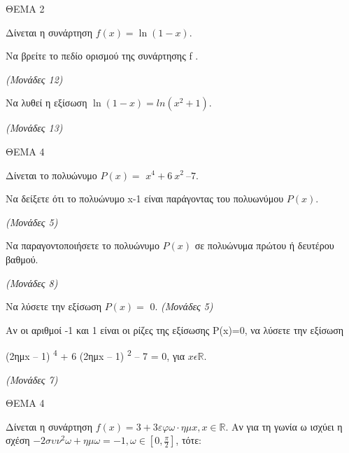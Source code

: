 \documentclass[11pt,a4paper,twoside]{book}
\newcommand{\monades}[1]{\hfill \textit{(Μονάδες #1)}}
\begin{document}
\vspace{4mm}

ΘΕΜΑ 2

Δίνεται η συνάρτηση $f(x) = \ln{(1 - x)}.$

\begin{alist}
\item Να βρείτε το πεδίο ορισμού της συνάρτησης f .

\monades{12}

\item Να λυθεί η εξίσωση $\ln(1 - x) = ln(x^{2} + 1).$

\monades{13}
\end{alist}

\vspace{4mm}

ΘΕΜΑ 4

Δίνεται το πολυώνυμο $P(x) =$ $x^{4} + 6{\ x}^{2}\ –7$.

\begin{alist}
\item Να δείξετε ότι το πολυώνυμο x-1 είναι παράγοντας του πολυωνύμου $P(x).$

\monades{5}

\item Να παραγοντοποιήσετε το πολυώνυμο $P(x)$ σε πολυώνυμα πρώτου ή δευτέρου βαθμού.

\monades{8}

\item

\begin{rlist}
\item Να λύσετε την εξίσωση $P(x) =$ 0. \monades{5}

\item Αν οι αριθμοί -1 και 1 είναι οι ρίζες της εξίσωσης P(x)=0, να λύσετε την εξίσωση

(2ημx -- 1) \textsuperscript{4} + 6 (2ημx -- 1) \textsuperscript{2} -- 7 = 0, για $x\epsilon\mathbb{R.}$

\monades{7}
\end{rlist}
\end{alist}

\vspace{4mm}

ΘΕΜΑ 4

Δίνεται η συνάρτηση $f(x) = 3 + 3\varepsilon\varphi\omega\cdot \eta\mu x, x \in \mathbb{R}$. Αν για τη γωνία ω ισχύει η σχέση $-2\sigma\upsilon\nu^2\omega + \eta\mu\omega = -1, \omega \in \left[0, \frac{\pi}{2}\right]$, τότε:
\end{document}

